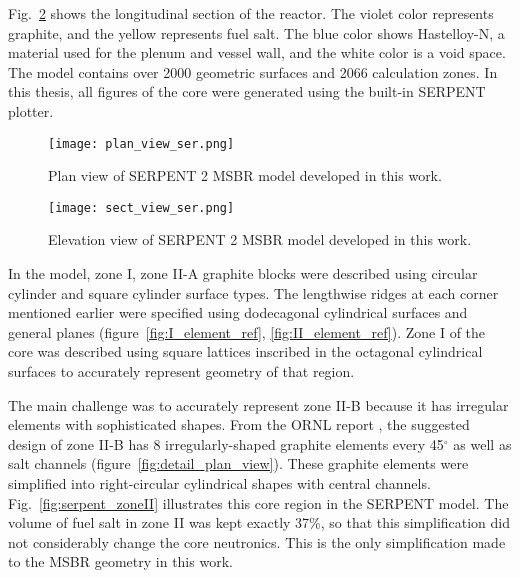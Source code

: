 Fig.~\ref{fig:serpent_sectional_view} shows the longitudinal section of the reactor. The violet color represents graphite, and the yellow represents fuel salt. The blue color shows Hastelloy-N, a material used for the plenum and vessel wall, and the white color is a void space. The model contains over 2000 geometric surfaces and 2066 calculation zones. In this thesis, all figures of the core were generated using the built-in SERPENT plotter.

\begin{figure}[hbp!] %
  \centering
  \vspace{-0.3em}
  \texttt{[image: plan\_view\_ser.png]}
  \caption{Plan view of SERPENT 2 \gls{MSBR} model developed in this work.}
  \vspace{-0.6em}
  \label{fig:serpent_plan_view}
\end{figure}
\FloatBarrier

\begin{figure}[hbp!] %
  \centering
  \vspace{-0.3em}
  \texttt{[image: sect\_view\_ser.png]}
  \caption{Elevation view of SERPENT 2 \gls{MSBR} model developed in this work.}
  \vspace{-0.6em}
  \label{fig:serpent_sectional_view}
\end{figure}
\FloatBarrier

In the model, zone I, zone II-A graphite blocks were described using circular cylinder and square cylinder surface types. The lengthwise ridges at each corner mentioned earlier were specified using dodecagonal cylindrical surfaces and general planes (figure~\ref{fig:I_element_ref}, \ref{fig:II_element_ref}). Zone I of the core was described using square lattices inscribed in the octagonal cylindrical surfaces to accurately represent geometry of that region.

The main challenge was to accurately represent zone II-B because it has irregular elements with sophisticated shapes. From the \gls{ORNL} report \cite{robertson_conceptual_1971}, the suggested design of zone II-B has 8 irregularly-shaped graphite elements every 45$^\circ$ as well as salt channels (figure~\ref{fig:detail_plan_view}). These graphite elements were simplified into right-circular cylindrical shapes  with central channels. Fig.~\ref{fig:serpent_zoneII} illustrates this core region in the SERPENT model. The volume of fuel salt in zone II was kept exactly 37\%, so that this simplification did not considerably change the core neutronics. This is the only simplification made to the \gls{MSBR} geometry in this work. 

